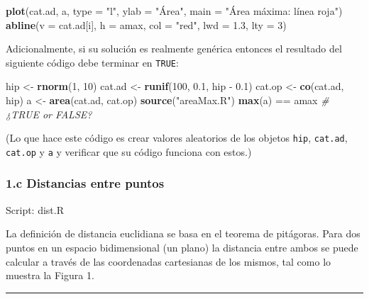 \documentclass[]{article}
\newenvironment{Shaded}{}{}
\newcommand{\KeywordTok}[1]{\textcolor[rgb]{0.00,0.44,0.13}{\textbf{{#1}}}}
\newcommand{\DataTypeTok}[1]{\textcolor[rgb]{0.56,0.13,0.00}{{#1}}}
\newcommand{\DecValTok}[1]{\textcolor[rgb]{0.25,0.63,0.44}{{#1}}}
\newcommand{\FloatTok}[1]{\textcolor[rgb]{0.25,0.63,0.44}{{#1}}}
\newcommand{\StringTok}[1]{\textcolor[rgb]{0.25,0.44,0.63}{{#1}}}
\newcommand{\CommentTok}[1]{\textcolor[rgb]{0.38,0.63,0.69}{\textit{{#1}}}}
\newcommand{\NormalTok}[1]{{#1}}
\begin{document}
\begin{Shaded}
\begin{Highlighting}[]
\KeywordTok{plot}\NormalTok{(cat.ad, a, }\DataTypeTok{type =} \StringTok{"l"}\NormalTok{, }\DataTypeTok{ylab =} \StringTok{"Área"}\NormalTok{, }\DataTypeTok{main =} \StringTok{"Área máxima: línea roja"}\NormalTok{)}
\KeywordTok{abline}\NormalTok{(}\DataTypeTok{v =} \NormalTok{cat.ad[i], }\DataTypeTok{h =} \NormalTok{amax, }\DataTypeTok{col =} \StringTok{"red"}\NormalTok{, }\DataTypeTok{lwd =} \FloatTok{1.3}\NormalTok{, }\DataTypeTok{lty =} \DecValTok{3}\NormalTok{)}
\end{Highlighting}
\end{Shaded}
Adicionalmente, si su solución es realmente genérica entonces el
resultado del siguiente código debe terminar en \texttt{TRUE}:

\begin{Shaded}
\begin{Highlighting}[]
\NormalTok{hip <- }\KeywordTok{rnorm}\NormalTok{(}\DecValTok{1}\NormalTok{, }\DecValTok{10}\NormalTok{)}
\NormalTok{cat.ad <- }\KeywordTok{runif}\NormalTok{(}\DecValTok{100}\NormalTok{, }\FloatTok{0.1}\NormalTok{, hip - }\FloatTok{0.1}\NormalTok{)}
\NormalTok{cat.op <- }\KeywordTok{co}\NormalTok{(cat.ad, hip)}
\NormalTok{a <- }\KeywordTok{area}\NormalTok{(cat.ad, cat.op)}
\KeywordTok{source}\NormalTok{(}\StringTok{"areaMax.R"}\NormalTok{)}
\KeywordTok{max}\NormalTok{(a) == amax  }\CommentTok{# ¿TRUE or FALSE?}
\end{Highlighting}
\end{Shaded}
(Lo que hace este código es crear valores aleatorios de los objetos
\texttt{hip}, \texttt{cat.ad}, \texttt{cat.op} y \texttt{a} y verificar
que su código funciona con estos.)

\subsubsection{1.c Distancias entre puntos}

Script: dist.R

La definición de distancia euclidiana se basa en el teorema de
pitágoras. Para dos puntos en un espacio bidimensional (un plano) la
distancia entre ambos se puede calcular a través de las coordenadas
cartesianas de los mismos, tal como lo muestra la Figura 1.

\begin{center}\rule{3in}{0.4pt}\end{center}
\end{document}
